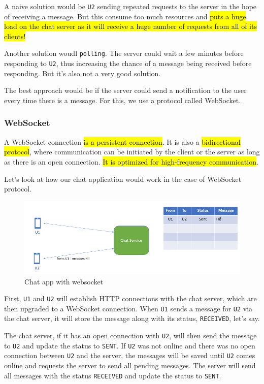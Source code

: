 A naive solution would be \texttt{U2} sending repeated requests to the server 
in the hope of receiving a message. But this consume too much resources and \hl{puts
a huge load on the chat server as it will receive a huge number of requests from all of 
its clients!}

Another solution woudl \texttt{polling}. The server could wait a few minutes before
responding to \texttt{U2}, thus increasing the chance of a message being received before
responding. But it's also not a very good solution. 

The best approach would be if the server could send a notification to the user every 
time there is a message. For this, we use a protocol called WebSocket.

\subsubsection{WebSocket}

A WebSocket connection \hl{is a persistent connection}. It is also a 
\hl{bidirectional protocol}, where communication can be initiated by 
the client or the server as long as there is an open connection. 
\hl{It is optimized for high-frequency communication}.

Let's look at how our chat application would work in the case of WebSocket protocol.

\begin{figure}[h]
\centering
\includegraphics[width=0.8\linewidth]{figures/03_protocols_communication/websocket_protocol.png}
\caption{Chat app with websocket}
\label{fig:websocket_chat}
\end{figure}

First, \texttt{U1} and \texttt{U2} will establish HTTP connections with the chat server, 
which are then upgraded to a WebSocket connection. 
When \texttt{U1} sends a message for \texttt{U2} via the chat server, 
it will store the message along with its status, \texttt{RECEIVED}, let's say.

The chat server, if it has an open connection with \texttt{U2}, will 
then send the message to \texttt{U2} and update the status to \texttt{SENT}. 
If \texttt{U2} was not online and there was no open connection between 
\texttt{U2} and the server, the messages will be saved until \texttt{U2} 
comes online and requests the server to send all pending messages. 
The server will send all messages with the status \texttt{RECEIVED} and 
update the status to \texttt{SENT}.


